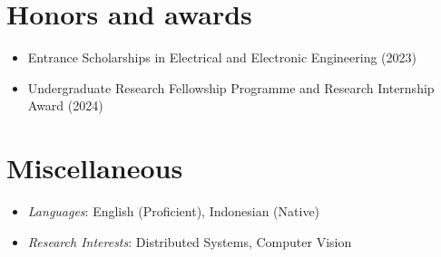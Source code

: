 \documentclass{cv}
\begin{document}
	\begin{adjustwidth}{}{\rightedge}
    \section*{Honors and awards}
	\begin{itemize}
	    \item Entrance Scholarships in Electrical and Electronic Engineering (2023)
	    \item Undergraduate Research Fellowship Programme and Research Internship Award (2024)
    \end{itemize}
    \vspace{0.2in}

    \section*{Miscellaneous}
    \begin{itemize}
        \item \textit{Languages}: English (Proficient), Indonesian (Native)
        \item \textit{Research Interests}: Distributed Systems, Computer Vision
    \end{itemize}
    \end{adjustwidth}
\end{document}
